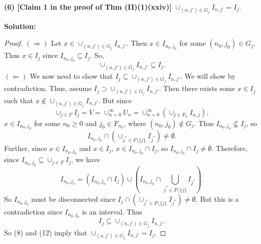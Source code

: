 \documentclass[12pt]{article}
\begin{document}
{\bf (6) [Claim 1 in the proof of Thm (II)(1)(xxiv)]} $\cup_{(n,j')\in
G_{j}}I_{n,j'} = I_{j}$.

{\bf Solution:}

\begin{proof}
$(\Rightarrow)$ Let $x \in \cup_{(n,j')\in G_{j}}I_{n,j'}$. Then $x \in I_{n_{0},j_{0}}$ for
some $(n_{0},j_{0}) \in G_{j}$. Thus $x \in I_{j}$ since $I_{n_{0},j_{0}}
\subseteq I_{j}$. So,
\begin{equation}
\cup_{(n,j')\in G_{j}}I_{n,j'} \subseteq I_{j}.
\end{equation}
$(\Leftarrow)$ We now need to show that $I_{j} \subseteq \cup_{(n,j')\in
G_{j}}I_{n,j'}$. We will show by contradiction. Thus, assume $I_{j} \supset
\cup_{(n,j')\in G_{j}}I_{n,j'}$. Then there exists some $x \in I_{j}$ such that
$x \notin \cup_{(n,j')\in G_{j}}I_{n,j'}$. But since 
\begin{equation}
\cup_{j\in F}I_{j} = V = \cup_{n=0}^{\infty}U_{n} =
\cup_{n=0}^{\infty}\left(\cup_{j\in F_{n}}I_{n,j}\right),
\end{equation}
$x\in I_{n_{0},j_{0}}$ for some $n_{0} \geq 0$ and $j_{0} \in F_{n_{0}}$, where
$(n_{0}, j_{0}) \notin G_{j}$. Thus $I_{n_{0},j_{0}} \nsubseteq I_{j}$, so 
\begin{equation}
I_{n_{0},j_{0}} \cap \left(\cup_{j^{*}\in F\setminus \{j\}}I_{j^{*}}\right) \neq
\emptyset.
\end{equation}
Further, since $x \in I_{n_{0},j_{0}}$ and $x\in I_{j}$, $x \in
I_{n_{0},j_{0}}\cap I_{j}$, so $I_{n_{0},j_{0}}\cap I_{j}\neq \emptyset$.
Therefore, since $I_{n_{0},j_{0}} \subseteq \cup_{j\in F}I_{j}$, we have
\begin{equation}
I_{n_{0},j_{0}} = \left( I_{n_{0},j_{0}} \cap I_{j} \right) \cup \left(
I_{n_{0},j_{0}} \cap \bigcup_{j^{*}\in F\setminus \{j\}}I_{j^{*}}
\right).
\end{equation}
So $I_{n_{0},j_{0}}$ must be disconnected since $I_{j} \cap \left(
\cup_{j^{*}\in F\setminus \{j\}}I_{j^{*}}
\right) \neq \emptyset$. But this is a contradiction since $I_{n_{0},j_{0}}$ is
an interval. Thus 
\begin{equation}
I_{j} \subseteq \cup_{(n,j')\in G_{j}}I_{n,j'}.
\end{equation}
So (8) and (12) imply that $\cup_{(n,j')\in G_{j}}I_{n,j'} = I_{j}$.
\end{proof}
\end{document}
